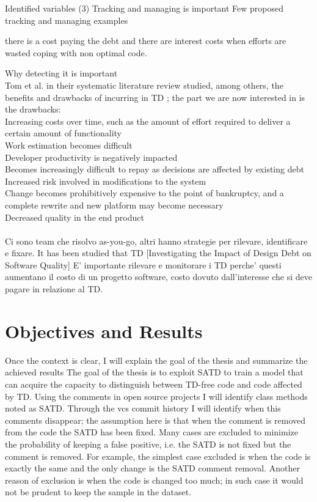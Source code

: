 Identified variables (3)
Tracking and managing is important
Few proposed tracking and managing examples

there is a cost paying the debt and there are interest costs when efforts are wasted coping with non optimal code.



Why detecting it is important\\
Tom et al. in their systematic literature review studied, among others, the benefits and drawbacks of incurring in TD \cite{tom2012consolidated}; the part we are now interested in is the drawbacks: 
\\
Increasing costs over time, such as the amount of effort required to deliver a certain amount of functionality 
\\
Work estimation becomes difficult
\\
Developer productivity is negatively impacted 
\\
Becomes increasingly difficult to repay as decisions are affected by existing debt 
\\
Increased risk involved in modifications to the system
\\
Change becomes prohibitively expensive to the point of bankruptcy, and a complete rewrite
and new platform may become necessary
\\
Decreased quality in the end product
\\
\\
Ci sono team che risolvo as-you-go, altri hanno strategie per rilevare, identificare e fixare.
It has been studied that TD [Investigating the Impact of Design Debt on Software Quality]
E' importante rilevare e monitorare i TD perche' questi aumentano il costo di un progetto software, costo dovuto dall'interesse che si deve pagare in relazione al TD.

\newpage




\section{Objectives and Results}
Once the context is clear, I will explain the goal of the thesis and summarize the achieved results
The goal of the thesis is to exploit SATD to train a model that can acquire the capacity to distinguish between TD-free code and code affected by TD.
Using the comments in open source projects I will identify class methods noted as SATD. Through the vcs commit history I will identify when this comments disappear; the assumption here is that when the comment is removed from the code the SATD has been fixed. Many cases are excluded to minimize the probability of keeping a false positive, i.e. the SATD is not fixed but the comment is removed. For example, the simplest case excluded is when the code is exactly the same and the only change is the SATD comment removal. Another reason of exclusion is when the code is changed too much; in such case it would not be prudent to keep the sample in the dataset.

